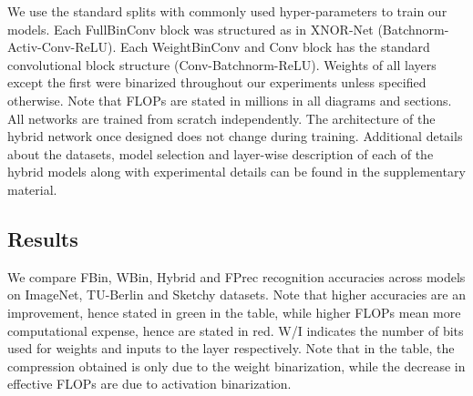 \documentclass[10pt,twocolumn,letterpaper]{article}
\begin{document}
We use the standard splits with commonly used hyper-parameters to train our models. Each FullBinConv block was structured as in XNOR-Net (Batchnorm-Activ-Conv-ReLU). Each WeightBinConv and Conv block has the standard convolutional block structure (Conv-Batchnorm-ReLU). Weights of all layers except the first were binarized throughout our experiments unless specified otherwise. Note that FLOPs are stated in millions in all diagrams and sections. All networks are trained from scratch independently. The architecture of the hybrid network once designed does not change during training. Additional details about the datasets, model selection and layer-wise description of each of the hybrid models along with experimental details can be found in the supplementary material. 



\subsection{Results}

We compare FBin, WBin, Hybrid and FPrec recognition accuracies across models on ImageNet, TU-Berlin and Sketchy datasets. Note that higher accuracies are an improvement, hence stated in green in the table, while higher FLOPs mean more computational expense, hence are stated in red. W/I indicates the number of bits used for weights and inputs to the layer respectively. Note that in the table, the compression obtained is only due to the weight binarization, while the decrease in effective FLOPs are due to activation binarization.
\end{document}
